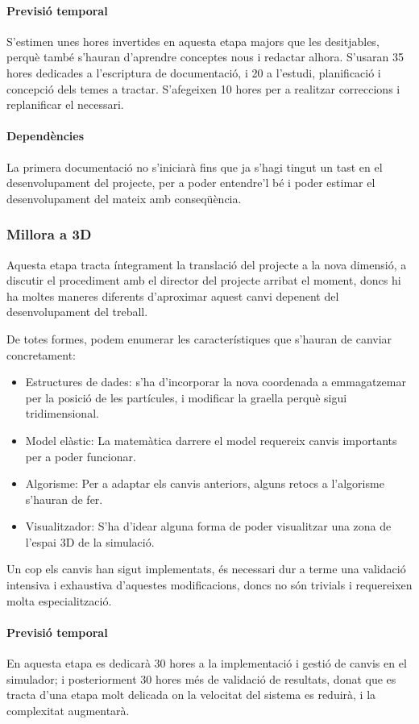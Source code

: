 \documentclass[a4paper]{report}
\begin{document}
	\paragraph{\quad Previsió temporal} S'estimen unes hores invertides en aquesta etapa majors que les desitjables, perquè també s'hauran d'aprendre conceptes nous i redactar alhora. S'usaran 35 hores dedicades a l'escriptura de documentació, i 20 a l'estudi, planificació i concepció dels temes a tractar. S'afegeixen 10 hores per a realitzar correccions i replanificar el necessari.
	\paragraph{\quad Dependències} La primera documentació no s'iniciarà fins que ja s'hagi tingut un tast en el desenvolupament del projecte, per a poder entendre'l bé i poder estimar el desenvolupament del mateix amb conseqüència.
	
	\subsubsection{Millora a 3D}
	Aquesta etapa tracta íntegrament la translació del projecte a la nova dimensió, a discutir el procediment amb el director del projecte arribat el moment, doncs hi ha moltes maneres diferents d'aproximar aquest canvi depenent del desenvolupament del treball. \par
	De totes formes, podem enumerar les característiques que s'hauran de canviar concretament:
	\begin{itemize}
		\item Estructures de dades: s'ha d'incorporar la nova coordenada a emmagatzemar per la posició de les partícules, i modificar la graella perquè sigui tridimensional.
		\item Model elàstic: La matemàtica darrere el model requereix canvis importants per a poder funcionar.
		\item Algorisme: Per a adaptar els canvis anteriors, alguns retocs a l'algorisme s'hauran de fer.
		\item Visualitzador: S'ha d'idear alguna forma de poder visualitzar una zona de l'espai 3D de la simulació.
	\end{itemize}

	Un cop els canvis han sigut implementats, és necessari dur a terme una validació intensiva i exhaustiva d'aquestes modificacions, doncs no són trivials i requereixen molta especialització.
	\paragraph{\quad Previsió temporal} En aquesta etapa es dedicarà 30 hores a la implementació i gestió de canvis en el simulador; i posteriorment 30 hores més de validació de resultats, donat que es tracta d'una etapa molt delicada on la velocitat del sistema es reduirà, i la complexitat augmentarà.
\end{document}
